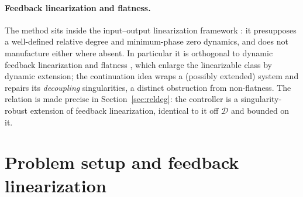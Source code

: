 \documentclass[11pt,american]{article}
\theoremstyle{definition}
\theoremstyle{plain}
\theoremstyle{remark}
\begin{document}
\paragraph{Feedback linearization and flatness.} The method sits inside the input--output linearization framework \cite{Isidori1995,SlotineLi1991,Khalil2002}: it presupposes a well-defined relative degree and minimum-phase zero dynamics, and does not manufacture either where absent. In particular it is orthogonal to dynamic feedback linearization and flatness \cite{Fliess1995}, which enlarge the linearizable class by dynamic extension; the continuation idea wraps a (possibly extended) system and repairs its \emph{decoupling} singularities, a distinct obstruction from non-flatness. The relation is made precise in Section~\ref{sec:reldeg}: the controller is a singularity-robust extension of feedback linearization, identical to it off $\mathcal D$ and bounded on it.

\section{Problem setup and feedback linearization}\label{sec:setup}
\end{document}

